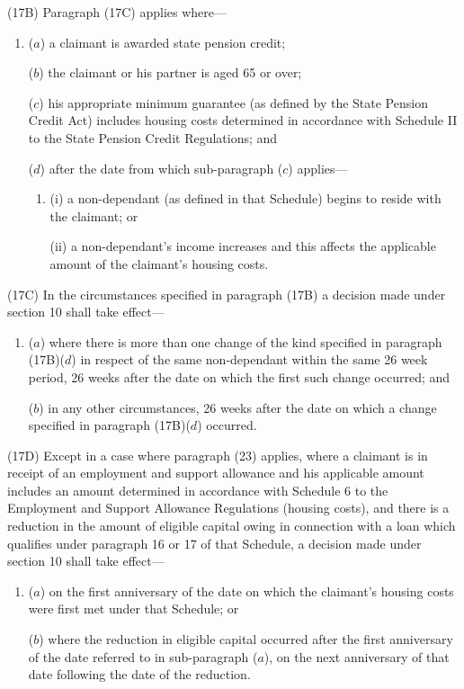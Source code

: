 \documentclass[12pt,a4paper]{article}
\begin{document}
(17B) Paragraph (17C) applies where—
\begin{enumerate}\item[]
($a$) a claimant is awarded state pension credit;

($b$) the claimant or his partner is aged 65 or over;

($c$) his appropriate minimum guarantee (as defined by the State Pension Credit Act) includes housing costs determined in accordance with Schedule II to the State Pension Credit Regulations; and

($d$) after the date from which sub-paragraph ($c$)  applies—
\begin{enumerate}\item[]
(i) a non-dependant (as defined in that Schedule) begins to reside with the claimant; or

(ii) a non-dependant’s income increases and this affects the applicable amount of the claimant’s housing costs.
\end{enumerate}
\end{enumerate}

(17C) In the circumstances specified in paragraph (17B) a decision made under section 10 shall take effect—
\begin{enumerate}\item[]
($a$) where there is more than one change of the kind specified in paragraph (17B)($d$)  in respect of the same non-dependant within the same 26 week period, 26 weeks after the date on which the first such change occurred; and

($b$) in any other circumstances, 26 weeks after the date on which a change specified in paragraph (17B)($d$)  occurred.
\end{enumerate}

(17D) Except in a case where paragraph (23) applies, where a claimant is in receipt of an employment and support allowance and his applicable amount includes an amount determined in accordance with Schedule 6 to the Employment and Support Allowance Regulations (housing costs), and there is a reduction in the amount of eligible capital owing in connection with a loan which qualifies under paragraph 16 or 17 of that Schedule, a decision made under section 10 shall take effect—
\begin{enumerate}\item[]
($a$) on the first anniversary of the date on which the claimant’s housing costs were first met under that Schedule; or

($b$) where the reduction in eligible capital occurred after the first anniversary of the date referred to in sub-paragraph ($a$), on the next anniversary of that date following the date of the reduction.
\end{enumerate}
\end{document}
